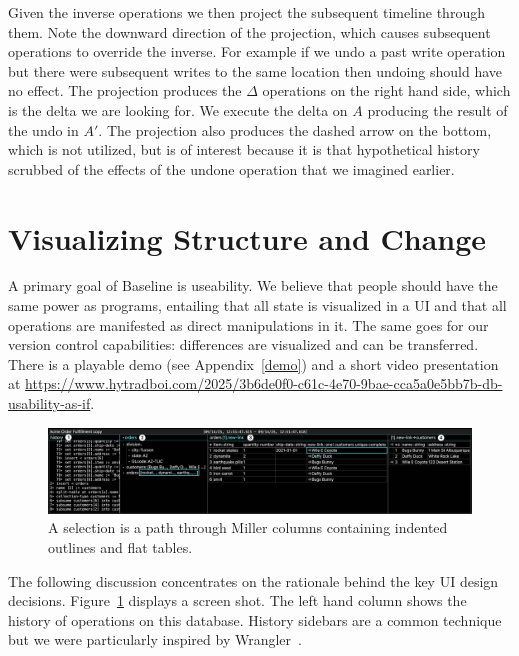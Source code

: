 \documentclass[english,submission]{programming}
\theoremstyle{definition}
\newcommand{\mathbox}[1]{\colorbox{black!10}{$#1$\phantom{i\hspace{-3.5pt}}}}
\begin{document}
Given the inverse operations we then project the subsequent timeline through them. Note the downward direction of the projection, which causes subsequent operations to override the inverse. For example if we undo a past \textsf{write} operation but there were subsequent writes to the same location then undoing should have no effect. The projection produces the \mathbox{\Delta} operations on the right hand side, which is the delta we are looking for. We execute the delta on \mathbox{A} producing the result of the undo in \mathbox{A'}. The projection also produces the dashed arrow on the bottom, which is not utilized, but is of interest because it is that hypothetical history scrubbed of the effects of the undone operation that we imagined earlier.




\section{Visualizing Structure and Change}\label{UI}

A primary goal of Baseline is useability. We believe that people should have the same power as programs, entailing that all state is visualized in a UI and that all operations are manifested as direct manipulations in it. The same goes for our version control capabilities: differences are visualized and can be transferred. There is a playable demo (see Appendix~\ref{demo}) and a short video presentation at  \url{https://www.hytradboi.com/2025/3b6de0f0-c61c-4e70-9bae-cca5a0e5bb7b-db-usability-as-if}.

\begin{figure}[h]
\includegraphics[width=\textwidth]{GUInumbered.png}
\caption{A selection is a path through Miller columns containing indented outlines and flat tables.}
\label{fig:UI}
\end{figure}


The following discussion concentrates on the rationale behind the key UI design decisions.
Figure~\ref{fig:UI} displays a screen shot.  The left hand column shows the history of operations on this database. History sidebars are a common technique but we were particularly inspired by Wrangler~\cite{kandel11}.
\end{document}
